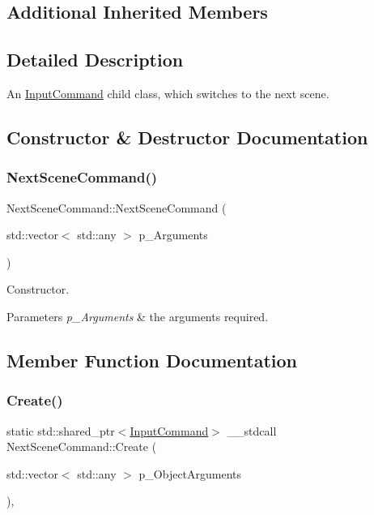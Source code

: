 \subsection*{Additional Inherited Members}


\subsection{Detailed Description}
An \mbox{\hyperlink{class_input_command}{Input\+Command}} child class, which switches to the next scene. 

\subsection{Constructor \& Destructor Documentation}
\mbox{\label{class_next_scene_command_a96a3b620d5d9bf6760e73f17ff2895d2}} 
\subsubsection{\texorpdfstring{NextSceneCommand()}{NextSceneCommand()}}
{\footnotesize\ttfamily Next\+Scene\+Command\+::\+Next\+Scene\+Command (\begin{DoxyParamCaption}\item[{std\+::vector$<$ std\+::any $>$}]{p\+\_\+\+Arguments }\end{DoxyParamCaption})\hspace{0.3cm}{\ttfamily [inline]}}



Constructor. 


\begin{DoxyParams}{Parameters}
{\em p\+\_\+\+Arguments} & the arguments required. \\
\hline
\end{DoxyParams}


\subsection{Member Function Documentation}
\mbox{\label{class_next_scene_command_ab2fa1c82edea29992e310a48cc4358f4}} 
\subsubsection{\texorpdfstring{Create()}{Create()}}
{\footnotesize\ttfamily static std\+::shared\+\_\+ptr$<$\mbox{\hyperlink{class_input_command}{Input\+Command}}$>$ \+\_\+\+\_\+stdcall Next\+Scene\+Command\+::\+Create (\begin{DoxyParamCaption}\item[{std\+::vector$<$ std\+::any $>$}]{p\+\_\+\+Object\+Arguments }\end{DoxyParamCaption})\hspace{0.3cm}{\ttfamily [inline]}, {\ttfamily [static]}}



